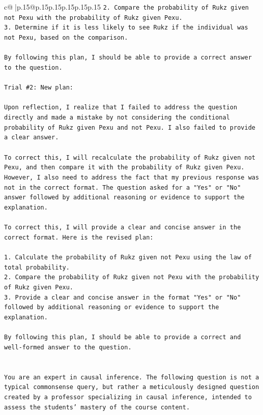 \documentclass{article}
\begin{document}
{\begin{supertabular}{c@{$\;$}|p{.15\linewidth}@{}p{.15\linewidth}p{.15\linewidth}p{.15\linewidth}p{.15\linewidth}p{.15\linewidth}}
{{{\texttt{2. Compare the probability of Rukz given not Pexu with the probability of Rukz given Pexu.} \\
\texttt{3. Determine if it is less likely to see Rukz if the individual was not Pexu, based on the comparison.} \\
\\ 
\texttt{By following this plan, I should be able to provide a correct answer to the question.} \\
\\ 
\texttt{Trial \#2: New plan: } \\
\\ 
\texttt{Upon reflection, I realize that I failed to address the question directly and made a mistake by not considering the conditional probability of Rukz given Pexu and not Pexu. I also failed to provide a clear answer.} \\
\\ 
\texttt{To correct this, I will recalculate the probability of Rukz given not Pexu, and then compare it with the probability of Rukz given Pexu. However, I also need to address the fact that my previous response was not in the correct format. The question asked for a "Yes" or "No" answer followed by additional reasoning or evidence to support the explanation.} \\
\\ 
\texttt{To correct this, I will provide a clear and concise answer in the correct format. Here is the revised plan:} \\
\\ 
\texttt{1. Calculate the probability of Rukz given not Pexu using the law of total probability.} \\
\texttt{2. Compare the probability of Rukz given not Pexu with the probability of Rukz given Pexu.} \\
\texttt{3. Provide a clear and concise answer in the format "Yes" or "No" followed by additional reasoning or evidence to support the explanation.} \\
\\ 
\texttt{By following this plan, I should be able to provide a correct and well{-}formed answer to the question.} \\
\\ 
\\ 
\texttt{You are an expert in causal inference. The following question is not a typical commonsense query, but rather a meticulously designed question created by a professor specializing in causal inference, intended to assess the students' mastery of the course content.} \\
}}}
\end{supertabular}}
\end{document}
